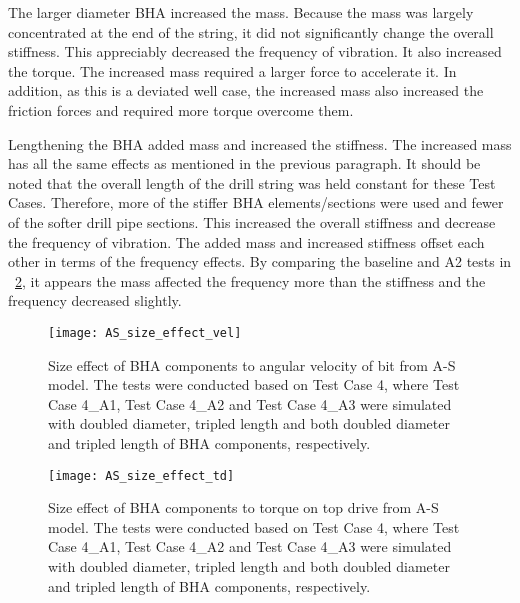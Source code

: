The larger diameter BHA increased the mass.  Because the mass was largely concentrated at the end of the string, it did not significantly change the overall stiffness.  This appreciably decreased the frequency of vibration.  It also increased the torque.  The increased mass required a larger force to accelerate it.  In addition, as this is a deviated well case, the increased mass also increased the friction forces and required more torque overcome them.

Lengthening the BHA added mass and increased the stiffness.  The increased mass has all the same effects as mentioned in the previous paragraph.  It should be noted that the overall length of the drill string was held constant for these Test Cases.  Therefore, more of the stiffer BHA elements/sections were used and fewer of the softer drill pipe sections.  This increased the overall stiffness and decrease the frequency of vibration.  The added mass and increased stiffness offset each other in terms of the frequency effects.  By comparing the baseline and A2 tests in \figurename{}~\ref{figure_AS_BHA_size_effect_td}, it appears the mass affected the frequency more than the stiffness and the frequency decreased slightly. 

\begin{figure}
	\centering
	\texttt{[image: AS\_size\_effect\_vel]}
    \caption[Size effect of BHA components to angular velocity from A-S model]{Size effect of BHA components to angular velocity of bit from A-S model. The tests were conducted based on Test Case 4, where Test Case 4\_A1, Test Case 4\_A2 and Test Case 4\_A3 were simulated with doubled diameter, tripled length and both doubled diameter and tripled length of BHA components, respectively.}
	\label{figure_AS_BHA_size_effect_vel}
\end{figure}

\begin{figure}
	\centering
	\texttt{[image: AS\_size\_effect\_td]}
    \caption[Size effect of BHA components to a torque from A-S model]{Size effect of BHA components to torque on top drive from A-S model. The tests were conducted based on Test Case 4, where Test Case 4\_A1, Test Case 4\_A2 and Test Case 4\_A3 were simulated with doubled diameter, tripled length and both doubled diameter and tripled length of BHA components, respectively.}
	\label{figure_AS_BHA_size_effect_td}
\end{figure}

